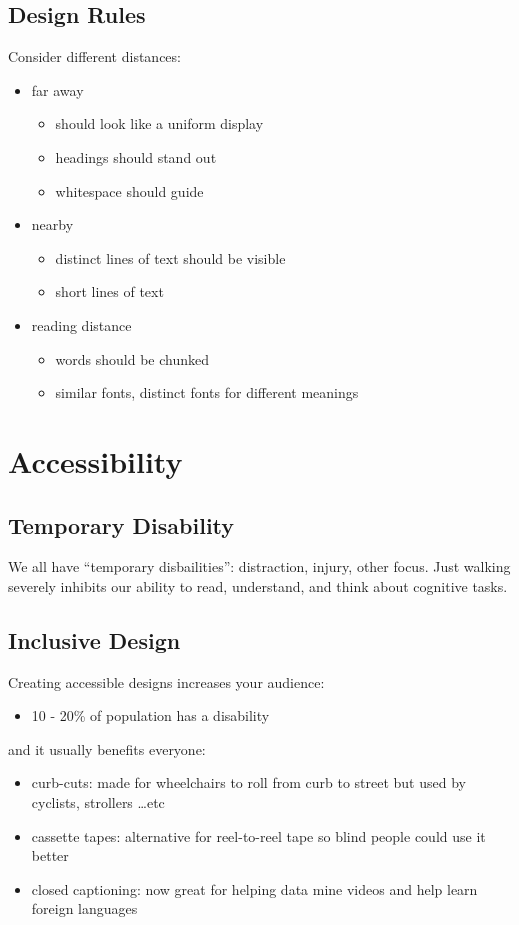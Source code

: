\documentclass[]{article}
\theoremstyle{definition}
\begin{document}
	\subsection{Design Rules}
	Consider different distances:
	\begin{itemize}
		\item far away
			\begin{itemize}
				\item should look like a uniform display
				\item headings should stand out
				\item whitespace should guide
			\end{itemize}
		\item nearby
			\begin{itemize}
				\item distinct lines of text should be visible
				\item short lines of text
			\end{itemize}
		\item reading distance
			\begin{itemize}
				\item words should be chunked
				\item similar fonts, distinct fonts for different meanings
			\end{itemize}
	\end{itemize}

	\section{Accessibility}

	\subsection{Temporary Disability}
	We all have ``temporary disbailities'': distraction, injury, other focus. Just walking
	severely inhibits our ability to read, understand, and think about cognitive tasks.

	\subsection{Inclusive Design}
	Creating accessible designs increases your audience:
	\begin{itemize}
		\item 10 - 20\% of population has a disability
	\end{itemize}
	and it usually benefits everyone:
	\begin{itemize}
		\item curb-cuts: made for wheelchairs to roll from curb to street but used by cyclists, strollers \dots etc
		\item cassette tapes: alternative for reel-to-reel tape so blind people could use it better
		\item closed captioning: now great for helping data mine videos and help learn foreign languages
	\end{itemize}
\end{document}
